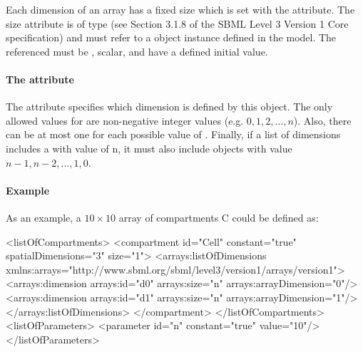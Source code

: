 Each dimension of an array has a fixed size which is set with the  attribute.   The size attribute is of type   (see Section 3.1.8 of the SBML Level 3 Version 1 Core specification) and must refer to a \Parameter object instance defined in the model.   The \Parameter referenced must be , scalar, and have a defined initial value.

\paragraph{The  attribute}

The  attribute specifies which dimension is defined by this \Dimension object.    
{\color{red} The only allowed values for  are non-negative
integer values (e.g. $0,1,2,\dots,n$)}.   Also, there can be at most one \Dimension for each possible value of
.   
{\color{red} Finally, if a list of dimensions includes a
\Dimension with  value of n, it must also
include \Dimension objects with value $n-1, n-2, \dots , 1, 0$.}

\paragraph{Example}

As an example, a $10 \times 10$ array of compartments C could be defined as:

\begin{example}
<listOfCompartments>
    <compartment id="Cell" constant="true" spatialDimensions="3" size="1">
        <arrays:listOfDimensions
            xmlns:arrays="http://www.sbml.org/sbml/level3/version1/arrays/version1">
            <arrays:dimension arrays:id="d0" arrays:size="n" arrays:arrayDimension="0"/>
            <arrays:dimension arrays:id="d1" arrays:size="n" arrays:arrayDimension="1"/>
        </arrays:listOfDimensions>
    </compartment>
</listOfCompartments>
<listOfParameters>
    <parameter id="n" constant="true" value="10"/>
</listOfParameters>
\end{example}

